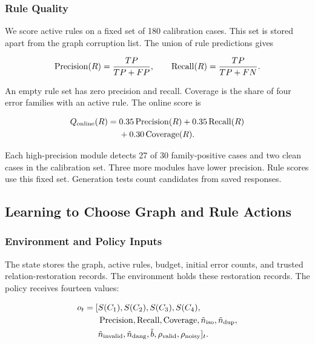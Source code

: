 \subsubsection{Rule Quality}

We score active rules on a fixed set of 180 calibration cases.
This set is stored apart from the graph corruption list.
The union of rule predictions gives

\begin{equation}
\operatorname{Precision}(R)=\frac{TP}{TP+FP},\qquad \operatorname{Recall}(R)=\frac{TP}{TP+FN}.
\end{equation}

An empty rule set has zero precision and recall. Coverage is the share
of four error families with an active rule. The online score is

\begin{equation}
\label{eq:qr_online}
\begin{aligned}Q_{\mathrm{online}}(R)={}&0.35\operatorname{Precision}(R)+0.35\operatorname{Recall}(R)\\&+0.30\operatorname{Coverage}(R).\end{aligned}
\end{equation}

Each high-precision module detects 27 of 30 family-positive cases and
two clean cases in the calibration set. Three more modules have lower
precision. Rule scores use this fixed set. Generation tests count candidates
from saved responses.

\subsection{Learning to Choose Graph and Rule Actions}

\label{subsec:rl_co_optimization}

\subsubsection{Environment and Policy Inputs}

The state stores the graph, active rules, budget, initial error counts,
and trusted relation-restoration records. The environment holds these
restoration records. The policy receives fourteen values:

\begin{equation}
\begin{split}
o_t=[&S(C_1),S(C_2),S(C_3),S(C_4),\\
&\operatorname{Precision},\operatorname{Recall},\operatorname{Coverage},\tilde n_{\mathrm{iso}},\tilde n_{\mathrm{dup}},\\
&\tilde n_{\mathrm{invalid}},\tilde n_{\mathrm{dang}},\tilde b,\rho_{\mathrm{valid}},\rho_{\mathrm{noisy}}]_t.
\end{split}
\end{equation}

